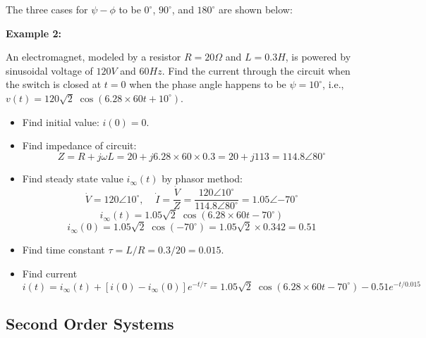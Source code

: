 \documentclass{article}
\begin{document}
The three cases for $\psi-\phi$ to be $0^\circ$, $90^\circ$, and $180^\circ$
are shown below:


{\bf Example 2:}

An electromagnet, modeled by a resistor $R=20\Omega$ and $L=0.3H$,
is powered by sinusoidal voltage of $120V$ and $60Hz$. Find the current
through the circuit when the switch is closed at $t=0$ when the phase
angle happens to be $\psi=10^\circ$, i.e., $v(t)=120\sqrt{2}\;
\cos(6.28\times 60 t+10^\circ)$.

\begin{itemize}
\item Find initial value: $i(0)=0$. 
\item Find impedance of circuit:
\begin{equation} 
  Z=R+j\omega L=20+j6.28\times 60 \times 0.3=20+j113=114.8\angle{80^\circ}	
\end{equation}
\item Find steady state value $i_\infty(t)$ by phasor method:
\begin{equation}
  \dot{V}=120 \angle{10^\circ},\;\;\;\;\dot{I}=\frac{\dot{V}}{Z}
  =\frac{120\angle{10^\circ}}{114.8\angle{80^\circ}}
  =1.05\angle{-70^\circ}	
\end{equation}
\begin{equation}
  i_\infty(t)=1.05\sqrt{2}\;\cos(6.28\times 60 t -70^\circ) 
\end{equation}
\begin{equation}
  i_\infty(0)=1.05\sqrt{2}\;\cos(-70^\circ)
  =1.05\sqrt{2}\times 0.342=0.51	
\end{equation}
\item Find time constant $\tau=L/R=0.3/20=0.015$.
\item Find current
\begin{equation}	
  i(t)=i_{\infty}(t)+[i(0)-i_{\infty}(0)]e^{-t/\tau}
  =1.05\sqrt{2}\;\cos(6.28\times 60 t -70^\circ)-0.51 e^{-t/0.015}	
\end{equation}

\end{itemize}




\subsection*{Second Order Systems}
\end{document}
